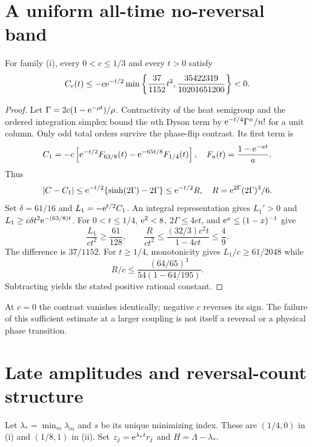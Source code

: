 \documentclass[11pt]{article}
\begin{document}
\section{A uniform all-time no-reversal band}
\begin{theorem}\label{thm:band}
For family (i), every $0<c\leq1/3$ and every $t>0$ satisfy
\[
 C_c(t)\leq-c\mathrm e^{-t/2}
  \min\left\{\frac{37}{1152}t^2,
       \frac{35422319}{10201651200}\right\}<0.
\]
\end{theorem}
\begin{proof}
Let $\Gamma=2c(1-\mathrm e^{-\rho t})/\rho$. Contractivity of the heat
semigroup and the ordered integration simplex bound the $n$th Dyson
term by $\mathrm e^{-t/4}\Gamma^n/n!$ for a unit column.
Only odd total orders survive the phase-flip contrast. Its first term is
\[
 C_1=-c\left[\mathrm e^{-t/2}F_{63/8}(t)
                 -\mathrm e^{-65t/8}F_{1/4}(t)\right],
 \quad F_a(t)=\frac{1-\mathrm e^{-at}}a .
\]
Thus
\[
 |C-C_1|\leq \mathrm e^{-t/2}\{\sinh(2\Gamma)-2\Gamma\}
       \leq \mathrm e^{-t/2}R,\quad
 R=\mathrm e^{2\Gamma}(2\Gamma)^3/6 .
\]
Set $\delta=61/16$ and $L_1=-\mathrm e^{t/2}C_1$.
An integral representation gives $L_1'>0$ and
$L_1\geq c\delta t^2\mathrm e^{-(63/8)t}$.
For $0<t\leq1/4$, $\mathrm e^2<8$, $2\Gamma\leq4ct$, and
$\mathrm e^x\leq(1-x)^{-1}$ give
\[
 \frac{L_1}{ct^2}\geq\frac{61}{128},\qquad
 \frac{R}{ct^2}\leq
 \frac{(32/3)c^2t}{1-4ct}\leq\frac49.
\]
The difference is $37/1152$.
For $t\geq1/4$, monotonicity gives $L_1/c\geq61/2048$ while
\[
 R/c\leq\frac{(64/65)^3}{54(1-64/195)} .
\]
Subtracting yields the stated positive rational constant.
\end{proof}
At $c=0$ the contrast vanishes identically; negative $c$ reverses its sign.
The failure of this sufficient estimate at a larger coupling is not itself
a reversal or a physical phase transition.

\section{Late amplitudes and reversal-count structure}
Let $\lambda_*=\min_m\lambda_m$ and $s$ be its unique minimizing index.
These are $(1/4,0)$ in (i) and $(1/8,1)$ in (ii). Set
$z_j=\mathrm e^{\lambda_*t}r_j$ and $H=\Lambda-\lambda_*$.
\end{document}
